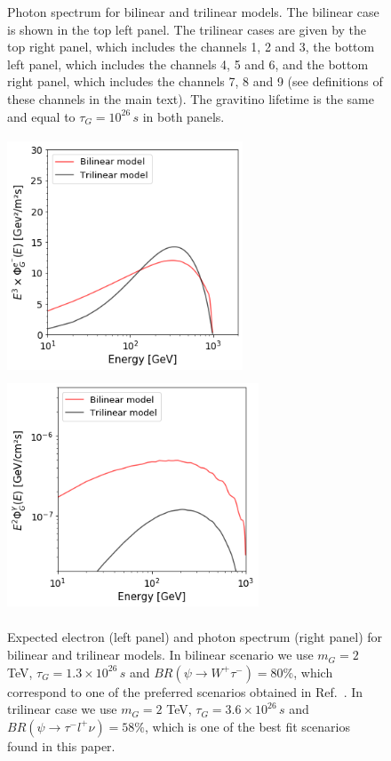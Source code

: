 \documentclass[a4paper,11pt]{article}
\begin{document}
\begin{figure}[htb]
\begin{center}
\caption{Photon spectrum for bilinear and trilinear models. The bilinear case is shown in the top left panel. The  trilinear cases are given by the top right panel, which includes the channels 1, 2 and 3, the bottom left panel, which includes the channels 4, 5 and 6, and the bottom right panel, which includes the channels 7, 8 and 9 (see definitions of these channels in the main text). The gravitino lifetime is the same and equal to $\tau_G = 10^{26}\,s$ in both panels.}
\label{fig:photon-spectrum}
\end{center}
\end{figure}


\begin{figure}[htb]
\begin{center}
\includegraphics[height=7cm,width=7cm,angle=0]{Draft/Figures/lepton-best-fit-comparison.png}
\includegraphics[height=7cm,width=7.5cm,angle=0]{Draft/Figures/photon-best-fit-comparison.png}
\caption{Expected electron (left panel) and photon spectrum (right panel) for bilinear and trilinear models. In bilinear scenario we use $m_G = 2$ TeV, $\tau_G=1.3\times10^{26}\, s$ and $BR(\psi\rightarrow W^{+}\tau^{-}) = 80\%$, which correspond to one of the preferred scenarios obtained in Ref.~\cite{Carquin:2015uma}. In trilinear case we use $m_G = 2$ TeV, $\tau_G=3.6\times10^{26}\, s$ and $BR(\psi\rightarrow \tau^{-}l^{+}\nu) = 58\%$, which is one of the best fit scenarios found in this paper.}
\label{fig:best-fit-spectrum}
\end{center}
\end{figure}
\end{document}
